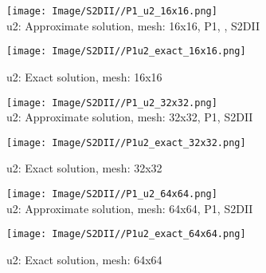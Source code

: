 \documentclass[a4paper,11pt]{article}
\begin{document}
\begin{figure}[bhpt]
  \hspace{35.pt}
  \begin{minipage}[t]{0.4 \textwidth}
    \centering
    \texttt{[image: Image/S2DII//P1\_u2\_16x16.png]}\\
    \caption{u2: Approximate solution, mesh: 16x16, P1, , S2DII}\label{fig:fig_P2_u2_16x16}
  \end{minipage}
  \hspace{0.1in}
  \begin{minipage}[t]{0.4 \textwidth}
    \centering
    \texttt{[image: Image/S2DII//P1u2\_exact\_16x16.png]}\\
    \caption{u2: Exact solution, mesh: 16x16}\label{fig:fig_P2u2_exact_16x16}
  \end{minipage}
\end{figure}

\begin{figure}[bhpt]
  \hspace{35.pt}
  \begin{minipage}[t]{0.4 \textwidth}
    \centering
    \texttt{[image: Image/S2DII//P1\_u2\_32x32.png]}\\
    \caption{u2: Approximate solution, mesh: 32x32, P1, S2DII}\label{fig:fig_P2_u2_32x32}
  \end{minipage}
  \hspace{0.1in}
  \begin{minipage}[t]{0.4 \textwidth}
    \centering
    \texttt{[image: Image/S2DII//P1u2\_exact\_32x32.png]}\\
    \caption{u2: Exact solution, mesh: 32x32}\label{fig:fig_P2u2_exact_32x32}
  \end{minipage}
\end{figure}

\begin{figure}[bhtp]
  \hspace{35.pt}
  \begin{minipage}[t]{0.4 \textwidth}
    \centering
    \texttt{[image: Image/S2DII//P1\_u2\_64x64.png]}\\
    \caption{u2: Approximate solution, mesh: 64x64, P1, S2DII}\label{fig:fig_P2_u2_64x64}
  \end{minipage}
  \hspace{0.1in}
  \begin{minipage}[t]{0.4 \textwidth}
    \centering
    \texttt{[image: Image/S2DII//P1u2\_exact\_64x64.png]}\\
    \caption{u2: Exact solution, mesh: 64x64}\label{fig:fig_P2u2_exact_64x64}
  \end{minipage}
\end{figure}
\end{document}
